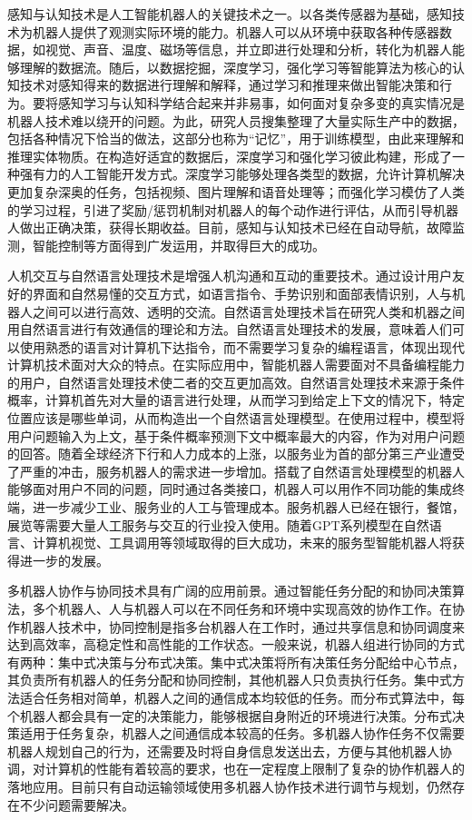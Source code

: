 感知与认知技术是人工智能机器人的关键技术之一。以各类传感器为基础，感知技术为机器人提供了观测实际环境的能力。机器人可以从环境中获取各种传感器数据，如视觉、声音、温度、磁场等信息，并立即进行处理和分析，转化为机器人能够理解的数据流。随后，以数据挖掘，深度学习，强化学习等智能算法为核心的认知技术对感知得来的数据进行理解和解释，通过学习和推理来做出智能决策和行为。要将感知学习与认知科学结合起来并非易事，如何面对复杂多变的真实情况是机器人技术难以绕开的问题。为此，研究人员搜集整理了大量实际生产中的数据，包括各种情况下恰当的做法，这部分也称为“记忆”，用于训练模型，由此来理解和推理实体物质。在构造好适宜的数据后，深度学习和强化学习彼此构建，形成了一种强有力的人工智能开发方式。深度学习能够处理各类型的数据，允许计算机解决更加复杂深奥的任务，包括视频、图片理解和语音处理等；而强化学习模仿了人类的学习过程，引进了奖励/惩罚机制对机器人的每个动作进行评估，从而引导机器人做出正确决策，获得长期收益。目前，感知与认知技术已经在自动导航，故障监测，智能控制等方面得到广发运用，并取得巨大的成功。

人机交互与自然语言处理技术是增强人机沟通和互动的重要技术。通过设计用户友好的界面和自然易懂的交互方式，如语言指令、手势识别和面部表情识别，人与机器人之间可以进行高效、透明的交流。自然语言处理技术旨在研究人类和机器之间用自然语言进行有效通信的理论和方法。自然语言处理技术的发展，意味着人们可以使用熟悉的语言对计算机下达指令，而不需要学习复杂的编程语言，体现出现代计算机技术面对大众的特点。在实际应用中，智能机器人需要面对不具备编程能力的用户，自然语言处理技术使二者的交互更加高效。自然语言处理技术来源于条件概率，计算机首先对大量的语言进行处理，从而学习到给定上下文的情况下，特定位置应该是哪些单词，从而构造出一个自然语言处理模型。在使用过程中，模型将用户问题输入为上文，基于条件概率预测下文中概率最大的内容，作为对用户问题的回答。随着全球经济下行和人力成本的上涨，以服务业为首的部分第三产业遭受了严重的冲击，服务机器人的需求进一步增加。搭载了自然语言处理模型的机器人能够面对用户不同的问题，同时通过各类接口，机器人可以用作不同功能的集成终端，进一步减少工业、服务业的人工与管理成本。服务机器人已经在银行，餐馆，展览等需要大量人工服务与交互的行业投入使用。随着GPT系列模型在自然语言、计算机视觉、工具调用等领域取得的巨大成功，未来的服务型智能机器人将获得进一步的发展。

多机器人协作与协同技术具有广阔的应用前景。通过智能任务分配的和协同决策算法，多个机器人、人与机器人可以在不同任务和环境中实现高效的协作工作。在协作机器人技术中，协同控制是指多台机器人在工作时，通过共享信息和协同调度来达到高效率，高稳定性和高性能的工作状态。一般来说，机器人组进行协同的方式有两种：集中式决策与分布式决策。集中式决策将所有决策任务分配给中心节点，其负责所有机器人的任务分配和协同控制，其他机器人只负责执行任务。集中式方法适合任务相对简单，机器人之间的通信成本均较低的任务。而分布式算法中，每个机器人都会具有一定的决策能力，能够根据自身附近的环境进行决策。分布式决策适用于任务复杂，机器人之间通信成本较高的任务。多机器人协作任务不仅需要机器人规划自己的行为，还需要及时将自身信息发送出去，方便与其他机器人协调，对计算机的性能有着较高的要求，也在一定程度上限制了复杂的协作机器人的落地应用。目前只有自动运输领域使用多机器人协作技术进行调节与规划，仍然存在不少问题需要解决。

